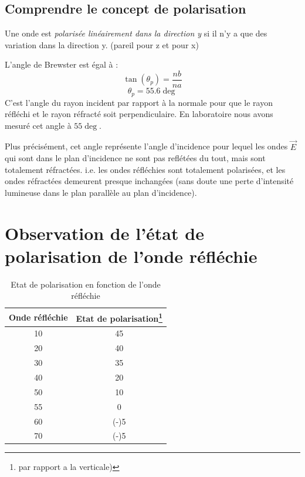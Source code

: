 \documentclass[a4paper,11pt]{article}
\begin{document}
\subsection{Comprendre le concept de polarisation}
Une onde est \textit{polarisée linéairement dans la direction y} si il n'y a que des variation dans la direction y. (pareil pour z et pour x)

L'angle de Brewster est égal à :
$$ \tan (\theta_p) = \frac{nb}{na} $$
$$ \theta_p = 55.6 \deg $$
C'est l'angle du rayon incident par rapport à la normale pour que le rayon réfléchi et le rayon réfracté soit perpendiculaire. En laboratoire nous avons mesuré cet angle  à $55 \deg$.

Plus précisément, cet angle représente l'angle d'incidence pour lequel les ondes $\vec{E}$ qui sont dans le plan d'incidence ne sont pas reflétées du tout, mais sont totalement réfractées. i.e. les ondes réfléchies sont totalement polarisées, et les ondes réfractées demeurent presque inchangées (sans doute une perte d'intensité lumineuse dans le plan parallèle au plan d'incidence).

\section{Observation de l'état de polarisation de l'onde réfléchie}
\begin{table}[!h]
	\begin{center}
	\begin{tabular}{|c|c|}
	\hline
		Onde réfléchie & Etat de polarisation\footnote{par rapport a la verticale)} \\
	\hline
		10 & 45 \\
		20 & 40 \\
		30 & 35 \\ 
		40 & 20 \\
		50 & 10 \\
		55 & 0 \\
		60 & (-)5 \\
		70 & (-)5 \\
	\hline
	\end{tabular}
	\caption{Etat de polarisation en fonction de l'onde réfléchie}
	\end{center}
\end{table}
\end{document}
